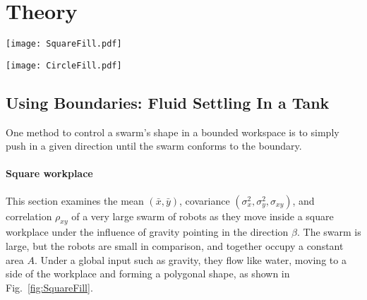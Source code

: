 \section{Theory}
\label{sec:theory}
\begin{figure*}[!htb]
\begin{center}
\texttt{[image: SquareFill.pdf]} 
\vspace{-1em}
\caption{Pushing the swarm against a square boundary wall allows limited control of the shape of the swarm, as a function of swarm area $A$ and the commanded movement direction $\beta$. Left plot shows locus of possible mean positions for five values of $A$.  The locus morphs from a square to a circle as $A$ increases.  The covariance ellipse for each $A$ is shown with a dashed line. Center shows two corresponding arrangements of kilobots.  At right is $\bar{x}(A), \sigma_{xy}(A), \sigma_x^2(A),$ and $\rho(A)$ for a range of $\beta$ values. See online interactive demonstration at \citep{Zhao2016mathematicaSquare}.}
\label{fig:SquareFill}
\end{center}
\end{figure*} 
\begin{figure*}[!htb]
\begin{center}
\texttt{[image: CircleFill.pdf]} 
\vspace{-1em}
\caption{Pushing the swarm against a circular boundary wall allows limited control of the shape of the swarm, as a function of the fill level $h$ and the commanded movement direction $\beta$. Left plot shows locus of possible mean positions for four values of $h$. The locus of possible mean positions are concentric circles. See online interactive demonstration at \citep{Zhao2016mathematica}.}  
\label{fig:CircleFill}
\end{center}
\end{figure*} 

\subsection{Using Boundaries: Fluid Settling In a Tank}\label{subsec:FluidInTank}
One method to control a swarm's shape in a bounded workspace is to simply push in a given direction until the swarm conforms to the boundary.
\paragraph{Square workplace}
This section examines the mean $(\bar{x},\bar{y})$, covariance $(\sigma^2_x,\sigma^2_y,\sigma_{xy})$, and correlation $\rho_{xy}$ of a very large swarm of robots as they move inside a square workplace under the influence of gravity pointing in the direction $\beta$. The swarm is large, but the robots are small in comparison, and together occupy a constant area $A$. Under a global input such as gravity, they flow like water, moving to a side of the workplace and forming a polygonal shape, as shown in Fig.~\ref{fig:SquareFill}. 

